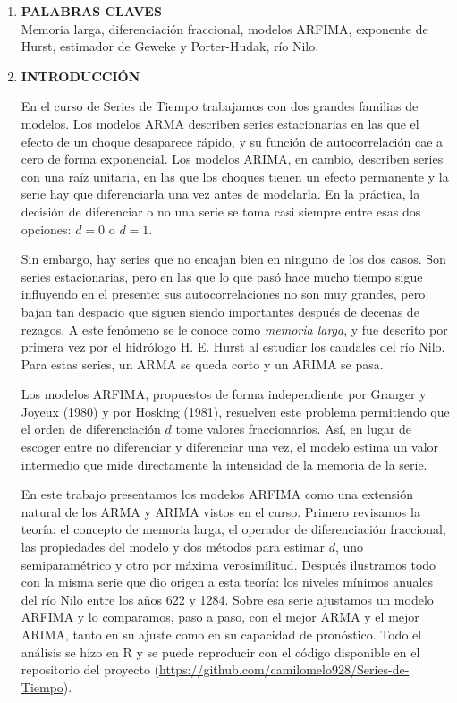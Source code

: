 \documentclass[legalpaper,11pt]{article}
\begin{document}
\begin{enumerate}
\item \textbf{PALABRAS CLAVES}\\
Memoria larga, diferenciaci\'on fraccional, modelos ARFIMA, exponente de Hurst, estimador de Geweke y Porter-Hudak, r\'io Nilo.
\medskip

\item \textbf{INTRODUCCI{\'O}N}

En el curso de Series de Tiempo trabajamos con dos grandes familias de modelos. Los modelos ARMA describen series estacionarias en las que el efecto de un choque desaparece r\'apido, y su funci\'on de autocorrelaci\'on cae a cero de forma exponencial. Los modelos ARIMA, en cambio, describen series con una ra\'iz unitaria, en las que los choques tienen un efecto permanente y la serie hay que diferenciarla una vez antes de modelarla. En la pr\'actica, la decisi\'on de diferenciar o no una serie se toma casi siempre entre esas dos opciones: $d = 0$ o $d = 1$.

Sin embargo, hay series que no encajan bien en ninguno de los dos casos. Son series estacionarias, pero en las que lo que pas\'o hace mucho tiempo sigue influyendo en el presente: sus autocorrelaciones no son muy grandes, pero bajan tan despacio que siguen siendo importantes despu\'es de decenas de rezagos. A este fen\'omeno se le conoce como \emph{memoria larga}, y fue descrito por primera vez por el hidr\'ologo H. E. Hurst al estudiar los caudales del r\'io Nilo. Para estas series, un ARMA se queda corto y un ARIMA se pasa.

Los modelos ARFIMA, propuestos de forma independiente por Granger y Joyeux (1980) y por Hosking (1981), resuelven este problema permitiendo que el orden de diferenciaci\'on $d$ tome valores fraccionarios. As\'i, en lugar de escoger entre no diferenciar y diferenciar una vez, el modelo estima un valor intermedio que mide directamente la intensidad de la memoria de la serie.

En este trabajo presentamos los modelos ARFIMA como una extensi\'on natural de los ARMA y ARIMA vistos en el curso. Primero revisamos la teor\'ia: el concepto de memoria larga, el operador de diferenciaci\'on fraccional, las propiedades del modelo y dos m\'etodos para estimar $d$, uno semiparam\'etrico y otro por m\'axima verosimilitud. Despu\'es ilustramos todo con la misma serie que dio origen a esta teor\'ia: los niveles m\'inimos anuales del r\'io Nilo entre los a\~nos 622 y 1284. Sobre esa serie ajustamos un modelo ARFIMA y lo comparamos, paso a paso, con el mejor ARMA y el mejor ARIMA, tanto en su ajuste como en su capacidad de pron\'ostico. Todo el an\'alisis se hizo en R y se puede reproducir con el c\'odigo disponible en el repositorio del proyecto (\url{https://github.com/camilomelo928/Series-de-Tiempo}).


\end{enumerate}
\end{document}
